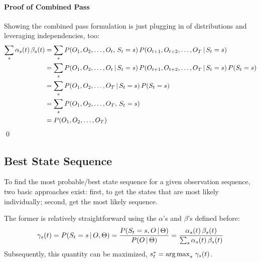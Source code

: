 			\paragraph{Proof of Combined Pass}
				Showing the combined pass formulation is just plugging in of distributions and leveraging independencies, too:
				\begin{align}
					\sum_s \alpha_s(t) \, \beta_s(t)
						&= \sum_s P(O_1, O_2, \dots, O_t,\, S_t = s) \, P(O_{t + 1}, O_{t + 2}, \dots, O_T \,\vert\, S_t = s) \\
						&= \sum_s P(O_1, O_2, \dots, O_t \,\vert\, S_t = s) \, P(O_{t + 1}, O_{t + 2}, \dots, O_T \,\vert\, S_t = s) \, P(S_t = s) \\
						&= \sum_s P(O_1, O_2, \dots, O_T \,\vert\, S_t = s) \, P(S_t = s) \\
						&= \sum_s P(O_1, O_2, \dots, O_T,\, S_t = s) \\
						&= P(O_1, O_2, \dots, O_T)
				\end{align}
				\qed

		\subsection{Best State Sequence}
			To find the most probable/best state sequence for a given observation sequence, two basic approaches exist: first, to get the states that are most likely individually; second, get the most likely sequence.

			The former is relatively straightforward using the \(\alpha\)'s and \(\beta\)'s defined before:
			\begin{equation}
				\gamma_s(t)
					= P(S_t = s \,\vert\, O, \Theta)
					= \frac{P(S_t = s, O \,\vert\, \Theta)}{P(O \,\vert\, \Theta)}
					= \frac{\alpha_s(t) \, \beta_s(t)}{\sum_s \alpha_s(t) \, \beta_s(t)}
			\end{equation}
			Subsequently, this quantity can be maximized, \( s_t^\ast = \operatorname*{arg\,max}_s \, \gamma_s(t) \).

